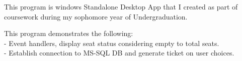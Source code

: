 \documentclass[hidelinks]{deedy-resume-openfont}
\renewcommand{\sectionsep}[0]{\vspace{8pt}}
\begin{document}
\begin{minipage}[t]{0.66\textwidth}
\descript{}
\begin{tightemize}
\item This program is windows Standalone Desktop App that I created as part of
 coursework during my sophomore year of Undergraduation. 
\item This program demonstrates the following:\\
  - Event handlers, display seat status considering empty to total seats.\\
  - Establish connection to MS-SQL DB and generate ticket on user choices.
\end{tightemize}
\sectionsep




%
%




\end{minipage}
\end{document}
